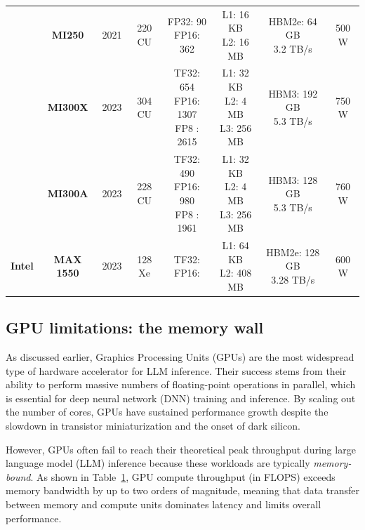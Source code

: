 \begin{table}[h!]
\begin{tabularx}{\textwidth}{|c|c|c|c|c|c|c|c|}
\cline{2-8}
 & \textbf{MI250}  & 2021 & 220 CU  & \makecell[l]{FP32: 90\\FP16: 362} & \makecell[l]{L1: 16 KB \\ L2: 16 MB } & \makecell[c]{HBM2e: 64 GB\\ 3.2 TB/s} & 500 W \\
\cline{2-8}
 & \textbf{MI300X} & 2023 & 304 CU  & \makecell[l]{TF32: 654\\FP16: 1307\\FP8 : 2615} & \makecell[l]{L1: 32 KB \\ L2: 4 MB \\ L3: 256 MB } & \makecell[c]{HBM3: 192 GB\\ 5.3 TB/s} & 750 W \\
 \cline{2-8}
 & \textbf{MI300A} & 2023 & 228 CU  & \makecell[l]{TF32: 490\\FP16: 980\\FP8 : 1961} & \makecell[l]{L1: 32 KB \\ L2: 4 MB \\ L3: 256 MB } & \makecell[c]{HBM3: 128 GB\\ 5.3 TB/s} & 760 W \\
\cline{1-8}
\multirow{1}{*}{\textbf{Intel}} 
 & \textbf{MAX 1550} & 2023 & 128 Xe  & \makecell[l]{TF32: \\FP16:} & \makecell[l]{L1: 64 KB \\ L2: 408 MB } & \makecell[c]{HBM2e: 128 GB\\ 3.28 TB/s} & 600 W \\
\cline{1-8}
\end{tabularx}
\label{tab:gpus}
\end{table}

\subsection{GPU limitations: the memory wall}

As discussed earlier, Graphics Processing Units (GPUs) are the most widespread type of hardware accelerator for LLM inference. Their success stems from their ability to perform massive numbers of floating-point operations in parallel, which is essential for deep neural network (DNN) training and inference. By scaling out the number of cores, GPUs have sustained performance growth despite the slowdown in transistor miniaturization and the onset of dark silicon.

However, GPUs often fail to reach their theoretical peak throughput during large language model (LLM) inference because these workloads are typically \textit{memory-bound}. As shown in Table~\ref{tab:gpus}, GPU compute throughput (in FLOPS) exceeds memory bandwidth by up to two orders of magnitude, meaning that data transfer between memory and compute units dominates latency and limits overall performance.

